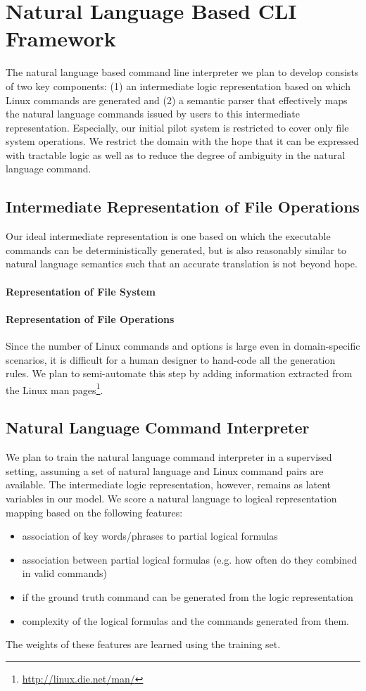 \section{Natural Language Based CLI Framework}

The natural language based command line interpreter we plan to develop consists of two key components: (1) an intermediate logic representation based on which Linux commands are generated and (2) a semantic parser that effectively maps the natural language commands issued by users to this intermediate representation. Especially, our initial pilot system is restricted to cover only file system operations. We restrict the domain with the hope that it can be expressed with tractable logic as well as to reduce the degree of ambiguity in the natural language command.

\subsection{Intermediate Representation of File Operations}
\label{subsec:represent}
Our ideal intermediate representation is one based on which the executable commands can be deterministically generated, but is also reasonably similar to natural language semantics such that an accurate translation is not beyond hope.
\paragraph{Representation of File System}
\paragraph{Representation of File Operations}
Since the number of Linux commands and options is large even in domain-specific scenarios, it is difficult for a human designer to hand-code all the generation rules. We plan to semi-automate this step by adding information extracted from the Linux man pages\footnote{\url{http://linux.die.net/man/}}.

\subsection{Natural Language Command Interpreter}
We plan to train the natural language command interpreter in a supervised setting, assuming a set of natural language and Linux command pairs are available. The intermediate logic representation, however, remains as latent variables in our model. We score a natural language to logical representation mapping based on the following features:
\begin{itemize}
	\item association of key words/phrases to partial logical formulas
	\item association between partial logical formulas (e.g. how often do they combined in valid commands)
	\item if the ground truth command can be generated from the logic representation
	\item complexity of the logical formulas and the commands generated from them.
\end{itemize}
The weights of these features are learned using the training set.